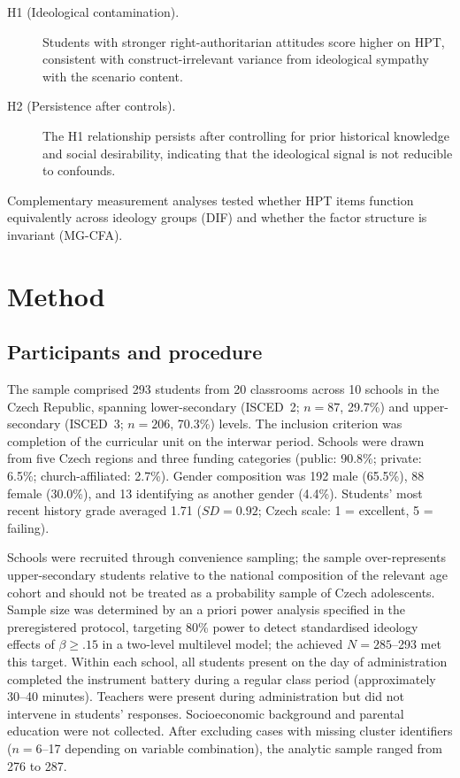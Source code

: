 \documentclass[pdflatex,sn-apa]{sn-jnl}%
\begin{document}
\begin{description}
\item[H1 (Ideological contamination).] Students with stronger right-authoritarian attitudes score higher on HPT, consistent with construct-irrelevant variance from ideological sympathy with the scenario content.
\item[H2 (Persistence after controls).] The H1 relationship persists after controlling for prior historical knowledge and social desirability, indicating that the ideological signal is not reducible to confounds.
\end{description}

Complementary measurement analyses tested whether HPT items function equivalently across ideology groups (DIF) and whether the factor structure is invariant (MG-CFA).


\section{Method}\label{sec:method}

\subsection{Participants and procedure}\label{subsec:participants}

The sample comprised 293 students from 20 classrooms across 10 schools in the Czech Republic, spanning lower-secondary (ISCED~2; $n = 87$, 29.7\%) and upper-secondary (ISCED~3; $n = 206$, 70.3\%) levels. The inclusion criterion was completion of the curricular unit on the interwar period. Schools were drawn from five Czech regions and three funding categories (public: 90.8\%; private: 6.5\%; church-affiliated: 2.7\%). Gender composition was 192 male (65.5\%), 88 female (30.0\%), and 13 identifying as another gender (4.4\%). Students' most recent history grade averaged 1.71 ($SD = 0.92$; Czech scale: 1 = excellent, 5 = failing).

Schools were recruited through convenience sampling; the sample over-represents upper-secondary students relative to the national composition of the relevant age cohort and should not be treated as a probability sample of Czech adolescents. Sample size was determined by an a priori power analysis specified in the preregistered protocol, targeting 80\% power to detect standardised ideology effects of $\beta \geq .15$ in a two-level multilevel model; the achieved $N = 285$--293 met this target. Within each school, all students present on the day of administration completed the instrument battery during a regular class period (approximately 30--40 minutes). Teachers were present during administration but did not intervene in students' responses. Socioeconomic background and parental education were not collected. After excluding cases with missing cluster identifiers ($n = 6$--17 depending on variable combination), the analytic sample ranged from 276 to 287.
\end{document}

